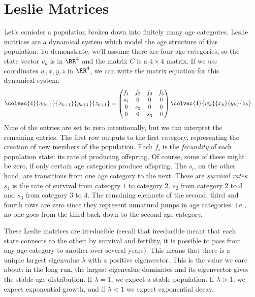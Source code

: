 \documentclass[fleqn]{report}
\begin{document}
\section{Leslie Matrices}
\label{leslie}

Let's conisder a population broken down into finitely many age
categories. Leslie matrices are a dynamical system which
model the age structure of this population. To demonstrate,
we'll assume there are four age categories, so the state
vector $v_k$ is in $\RR^4$ and the matrix $C$ is a $4 \times 4$
matrix. If we use coordinates $w,x,y,z$ in $\RR^4$, we can
write the matrix equation for this dynamical system.
\begin{equation*}
\colvec{4}{w_{k+1}}{x_{k+1}}{y_{k+1}}{z_{k+1}} = \left(
\begin{matrix} f_1 & f_2 & f_3 & f_4 \\ s_1 & 0 & 0 & 0 \\ 0 &
s_2 & 0 & 0 \\ 0 & 0 & s_3 & 0 \end{matrix} \right)
\colvec{4}{w_k}{x_k}{y_k}{z_k} 
\end{equation*}
Nine of the entries are set to zero intentionally, but we can
interpret the remaining entries. The first row outputs to the
first category, representing the creation of new members of the
population. Each $f_i$ is the \emph{fecundity} of each population
state: its rate of producing offspring. Of course, some of
these might be zero, if only certain age categories produce
offspring. The $s_i$, on the other hand, are transitions from
one age category to the next. These are \emph{survival rates}: 
$s_1$ is the rate of survival from cateogry $1$ to category
$2$, $s_2$ from category $2$ to $3$ and $s_3$ from category
$3$ to $4$. The remaining elemnets of the second, third and
fourth rows are zero since they represent unnatural jumps in
age categories: i.e., no one goes from the third back down to
the second age category.

These Leslie matrices are irreducible (recall that ireeducible
meant that each state connects to the other; by survival and
fertility, it is possible to pass from any age category to
another over several years). This means that there is a
unique largest eigenvalue $\lambda$ with a positive
eigenvector. This is the value we care about: in the long
run, the largest eigenvalue dominates and its eigenvector
gives the stable age distribution. If $\lambda = 1$, we
expect a stable population. If $\lambda > 1$, we expect
exponential growth, and if $\lambda < 1$ we expect
exponential decay. 
\end{document}
